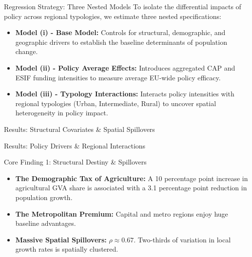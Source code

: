 \documentclass[aspectratio=169]{beamer}
\begin{document}
\begin{frame}{Regression Strategy: Three Nested Models}
    To isolate the differential impacts of policy across regional typologies, we estimate three nested specifications:\pause
    \begin{itemize}
        \item \textbf{Model (i) - Base Model:} Controls for structural, demographic, and geographic drivers to establish the baseline determinants of population change.\pause
        \item \textbf{Model (ii) - Policy Average Effects:} Introduces aggregated CAP and ESIF funding intensities to measure average EU-wide policy efficacy.\pause
        \item \textbf{Model (iii) - Typology Interactions:} Interacts policy intensities with regional typologies (Urban, Intermediate, Rural) to uncover spatial heterogeneity in policy impact.
    \end{itemize}
\end{frame}

\begin{frame}{Results: Structural Covariates \& Spatial Spillovers}
    \small
    
\end{frame}

\begin{frame}[shrink=20]{Results: Policy Drivers \& Regional Interactions}
    \footnotesize
    
\end{frame}

\begin{frame}{Core Finding 1: Structural Destiny \& Spillovers}
    \begin{itemize}
        \item \textbf{The Demographic Tax of Agriculture:} A 10 percentage point increase in agricultural GVA share is associated with a 3.1 percentage point reduction in population growth. \pause
        \item \textbf{The Metropolitan Premium:} Capital and metro regions enjoy huge baseline advantages.
        \pause
        \item \textbf{Massive Spatial Spillovers:} $\rho \approx 0.67$. Two-thirds of variation in local growth rates is spatially clustered.
    \end{itemize}
\end{frame}
\end{document}
